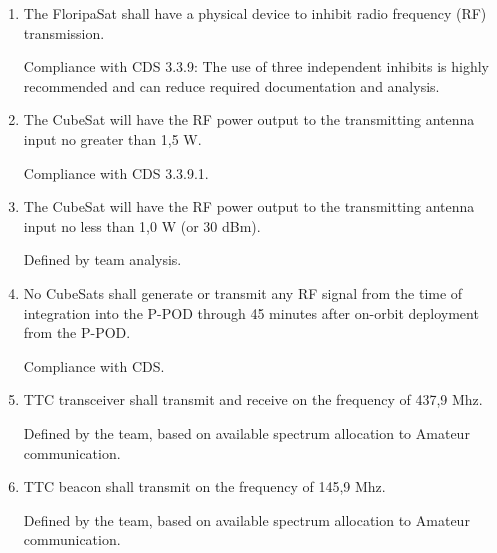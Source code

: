 \documentclass[12pt]{book}
\begin{document}
\begin{enumerate}[label=\textit{TMR \arabic*}, leftmargin=*, align=left]
	\item The FloripaSat shall have a physical device to inhibit radio frequency (RF) transmission.
	
	\begin{footnotesize}
		Compliance with CDS 3.3.9: The use of three independent inhibits is highly recommended and can reduce required documentation and analysis.	
	\end{footnotesize}
	
	\item The CubeSat will have the RF power output to the transmitting antenna input no greater than 1,5 W.
	
	\begin{footnotesize}
		Compliance with CDS 3.3.9.1.
	\end{footnotesize}
	
	\item The CubeSat will have the RF power output to the transmitting antenna input no less than 1,0 W (or 30 dBm).
	
	\begin{footnotesize}
		Defined by team analysis.
	\end{footnotesize}
	\item No CubeSats shall generate or transmit any RF signal from the time of integration into the P-POD through 45 minutes after on-orbit deployment from the P-POD.
	
	\begin{footnotesize}
		Compliance with CDS.
	\end{footnotesize}
	
	\item TTC transceiver shall transmit and receive on the frequency of 437,9 Mhz.
	
	\begin{footnotesize}
		Defined by the team, based on available spectrum allocation to Amateur communication.
	\end{footnotesize}
	
	\item TTC beacon shall transmit on the frequency of 145,9 Mhz.
	
	\begin{footnotesize}
		Defined by the team, based on available spectrum allocation to Amateur communication.
	\end{footnotesize}
	

\end{enumerate}
\end{document}
